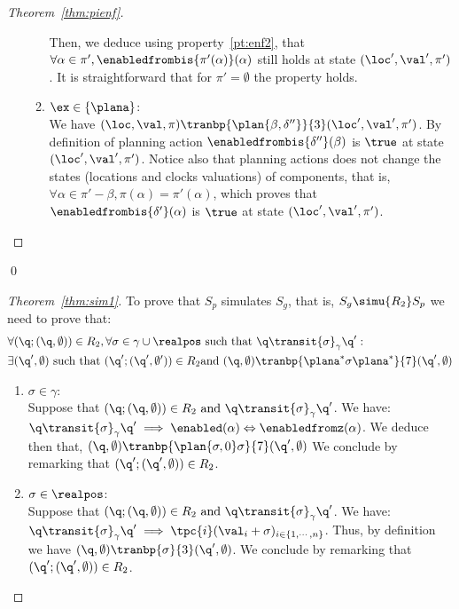 \begin{proof}[Theorem~\ref{thm:pienf}]
\begin{enumerate}
\begin{enumerate}
        Then, we deduce using property~\ref{pt:enf2}, that $\forall\alpha\in\pi',\enabledfrombis{\pi'(\alpha)}(\alpha)$ still holds at state $(\loc',\val',\pi')$.
        It is straightforward that for $\pi'=\emptyset$ the property holds. 
      \item $\ex\in\{\plana\}$:\\
        We have $(\loc,\val,\pi)\tranbp{\plan{\beta,\delta''}}{3}(\loc',\val',\pi')$. By definition of planning action $\enabledfrombis{\delta''}(\beta)$ is $\true$
        at state $(\loc',\val',\pi')$. Notice also that planning actions does not change the states (locations and clocks valuations) of components, that is,
        $\forall\alpha\in\pi'-\beta,\pi(\alpha)=\pi'(\alpha)$, which proves that $\enabledfrombis{\delta'}(\alpha)$ is $\true$ at state $(\loc',\val',\pi')$.  
    \end{enumerate}
  \end{enumerate}
\end{proof}
  \qed
\begin{proof}[Theorem~\ref{thm:sim1}]
\label{proof:sim1}
To prove that $S_{p}$ simulates 
$S_g$, that is, $S_g\simu{R_2}S_{p}$ we need to prove that:\\
\begin{displaymath}
  \begin{split}
    &\forall (\q;(\q,\emptyset))\in R_2,\forall \sigma\in\gamma\cup\realpos \text{ such that }
  \q\transit{\sigma}_{\gamma}\q':\\
  &\exists(\q',\emptyset) \text{ such that }
(\q';(\q',\emptyset'))\in R_2\text{and }(\q,\emptyset)\tranbp{\plana^*\sigma\plana^*}{7}
(\q',\emptyset)
  \end{split}
\end{displaymath}
\begin{enumerate}[label=(\roman*)]
\item $\sigma\in\gamma$:\\
  Suppose that $(\q;(\q,\emptyset))\in R_2 \text{ and } \q\transit{\sigma}_{\gamma}\q'$.
  We have: $\q\transit{\sigma}_{\gamma}\q'\implies\enabled(\alpha)\Leftrightarrow\enabledfromz(\alpha)$. We deduce then that,
  $(\q,\emptyset)\tranbp{\plan{\sigma,0}\sigma}{7}(\q',\emptyset)$  
We conclude by remarking that $(\q';(\q',\emptyset))\in R_2$.

\item $\sigma\in\realpos$:\\
  Suppose that $(\q;(\q,\emptyset))\in R_2 \text{ and } \q\transit{\sigma}_{\gamma}\q'$.
  We have:\\ $\q\transit{\sigma}_{\gamma}\q'\implies\tpc{i}(\val_i+\sigma)_{i\in\{1,\cdots,n
\}}$. Thus, by definition we have $(\q,\emptyset)\tranbp{\sigma}{3}(\q',\emptyset)$.
We conclude by remarking that $(\q';(\q',\emptyset))\in R_2$.
\end{enumerate}
\end{proof}
